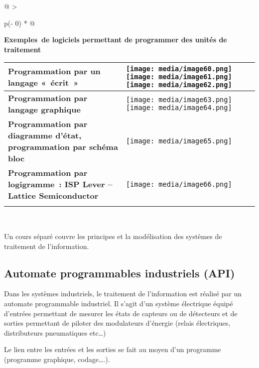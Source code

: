 \documentclass[
]{article}
\begin{document}
\begin{longtable}[]{@{}
  >{\raggedright\arraybackslash}p{(\columnwidth - 0\tabcolsep) * }@{}}
\toprule
\endhead
\begin{minipage}[t]{\linewidth}\raggedright
\textbf{Exemples~de logiciels permettant de programmer des unités de
traitement}

\begin{longtable}[]{@{}ll@{}}
\toprule
\textbf{Programmation par un langage «~écrit~»} &
\texttt{[image: media/image60.png]}\texttt{[image: media/image61.png]}
\texttt{[image: media/image62.png]} \\
\midrule
\endhead
\textbf{Programmation par langage graphique} &
\texttt{[image: media/image63.png]}\texttt{[image: media/image64.png]} \\
\textbf{Programmation par diagramme d'état, programmation par schéma
bloc} &
\texttt{[image: media/image65.png]} \\
\textbf{Programmation par logigramme~: ISP Lever -- Lattice
Semiconductor} &
\texttt{[image: media/image66.png]} \\
& \\
\bottomrule
\end{longtable}
\end{minipage} \\
\bottomrule
\end{longtable}

Un cours séparé couvre les principes et la modélisation des systèmes de
traitement de l'information.

\hypertarget{automate-programmables-industriels-api}{%
\subsection{Automate programmables industriels
(API)}\label{automate-programmables-industriels-api}}

Dans les systèmes industriels, le traitement de l'information est
réalisé par un automate programmable industriel. Il s'agit d'un système
électrique équipé d'entrées permettant de mesurer les états de capteurs
ou de détecteurs et de sorties permettant de piloter des modulateurs
d'énergie (relais électriques, distributeurs pneumatiques etc\ldots)

Le lien entre les entrées et les sorties se fait au moyen d'un programme
(programme graphique, codage\ldots.).
\end{document}
